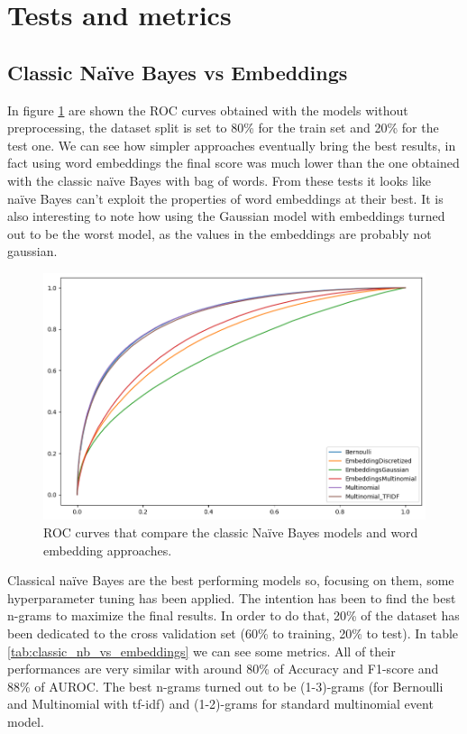 \section*{Tests and metrics}

\subsection*{Classic Na\"ive Bayes vs Embeddings}

In figure \ref{fig:classic_nb_vs_embeddings} are shown the ROC curves obtained with the models without preprocessing, the dataset split is set to 80\% for the train set and 20\% for the test one.
We can see how simpler approaches eventually bring the best results, in fact using word embeddings the final score was much lower than the one obtained with the classic na\"ive Bayes with bag of words. From these tests it looks like na\"ive Bayes can't exploit the properties of word embeddings at their best. It is also interesting to note how using the Gaussian model with embeddings turned out to be the worst model, as the values in the embeddings are probably not gaussian.

\begin{figure}[h!t]
    \centering
    \includegraphics[scale=0.50]{../experiments/plots/classic_nb_vs_embeddings}
    \caption{ROC curves that compare the classic Na\"ive Bayes models and
    word embedding approaches.}
    \label{fig:classic_nb_vs_embeddings}        
\end{figure}

Classical na\"ive Bayes are the best performing models so, focusing on them, some hyperparameter tuning has been applied. The intention has been to find the best n-grams to maximize the final results. In order to do that, 20\% of the dataset has been dedicated to the cross validation set (60\% to training, 20\% to test).
In table \ref{tab:classic_nb_vs_embeddings} we can see some metrics. 
All of their performances are very similar with around 80\% of Accuracy and F1-score and 88\% of AUROC. The best n-grams turned out to be (1-3)-grams (for Bernoulli and Multinomial with tf-idf) and (1-2)-grams for standard multinomial event model.

